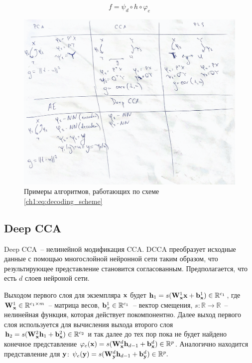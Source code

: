 \begin{equation}
f = \psi_d \circ h \circ \varphi_e
\label{eq:f}
\end{equation}

\begin{figure}[!ht]
	\centering
	\includegraphics[width=\linewidth]{figs/ch1/Examples}
	\caption{Примеры алгоритмов, работающих по схеме \ref{ch1:eq:decoding_scheme}}
	\label{ch1:fig:PLSFigure}
\end{figure}

\subsection{Deep CCA}

Deep CCA~-- нелинейной модификация CCA. DCCA преобразует исходные данные с помощью многослойной нейронной сети таким образом, что результирующее представление становится согласованным. Предполагается, что есть $d$ слоев нейроной сети. 

Выходом первого слоя для экземпляра $\mathbf{x}$ будет $\mathbf{h}_1 = s(\mathbf{W}^{1}_{\mathbf{x}}\mathbf{x} + \mathbf{b}^{1}_{\mathbf{x}}) \in \mathbb{R}^{c_1}$, где $\mathbf{W}_{\mathbf{x}}^{1} \in \mathbb{R}^{c_1 \times m}$~-- матрица весов, $\mathbf{b}_{x}^{1} \in \mathbb{R}^{c_1}$~-- вектор смещения, $s: \mathbb{R} \to \mathbb{R}$~-- нелинейная функция, которая действует покомпонентно. Далее выход первого слоя используется для вычисления выхода второго слоя $\mathbf{h}_{2} = s(\mathbf{W}^{2}_{\mathbf{x}}\mathbf{h}_{1} + \mathbf{b}^{2}_{\mathbf{x}}) \in \mathbb{R}^{c_2}$ и так далее до тех пор пока не будет найдено конечное представление $\varphi_e(\mathbf{x}) = s(\mathbf{W}^{d}_{\mathbf{x}}\mathbf{h}_{d-1} + \mathbf{b}^{d}_{\mathbf{x}}) \in \mathbb{R}^{p}$. Аналогично находится представление для $\mathbf{y}$: $\psi_e(\mathbf{y}) = s(\mathbf{W}^{d}_{\mathbf{y}}\mathbf{h}_{d-1} + \mathbf{b}^{d}_{\mathbf{y}}) \in \mathbb{R}^{p}.$

